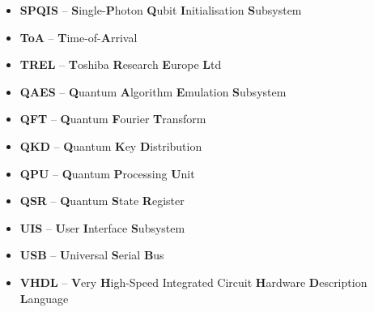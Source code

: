 \begin{itemize}
\item {\bf SPQIS}	-- \textbf{S}ingle-\textbf{P}hoton \textbf{Q}ubit \textbf{I}nitialisation \textbf{S}ubsystem 
\item {\bf ToA}	    -- \textbf{T}ime-of-\textbf{A}rrival
\item {\bf TREL}	-- \textbf{T}oshiba \textbf{R}esearch \textbf{E}urope \textbf{L}td
\item {\bf QAES}	-- \textbf{Q}uantum \textbf{A}lgorithm \textbf{E}mulation \textbf{S}ubsystem
\item {\bf QFT}	    -- \textbf{Q}uantum \textbf{F}ourier \textbf{T}ransform
\item {\bf QKD}	    -- \textbf{Q}uantum \textbf{K}ey \textbf{D}istribution
\item {\bf QPU}	    -- \textbf{Q}uantum \textbf{P}rocessing \textbf{U}nit
\item {\bf QSR}	    -- \textbf{Q}uantum \textbf{S}tate \textbf{R}egister
\item {\bf UIS}	    -- \textbf{U}ser \textbf{I}nterface \textbf{S}ubsystem
\item {\bf USB}	    -- \textbf{U}niversal \textbf{S}erial \textbf{B}us
\item {\bf VHDL}	-- \textbf{V}ery \textbf{H}igh-Speed Integrated Circuit \textbf{H}ardware \textbf{D}escription \textbf{L}anguage

\end{itemize}

